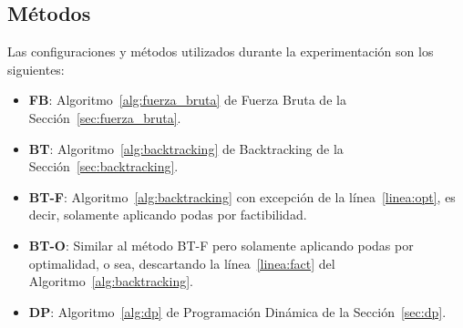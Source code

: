 \documentclass[10pt,a4paper]{article}
\begin{document}
\subsection{Métodos}
Las configuraciones y métodos utilizados durante la experimentación son los siguientes:
\begin{itemize}
    \setlength{\itemsep}{1pt}
    \setlength{\parskip}{0pt}
    \setlength{\parsep}{0pt}
    \item \textbf{FB}: Algoritmo~\ref{alg:fuerza_bruta} de Fuerza Bruta de la Sección~\ref{sec:fuerza_bruta}.
    \item \textbf{BT}: Algoritmo~\ref{alg:backtracking} de Backtracking de la Sección~\ref{sec:backtracking}.
    \item \textbf{BT-F}: Algoritmo~\ref{alg:backtracking} con excepción de la línea~\ref{linea:opt}, es decir, solamente aplicando podas por factibilidad.
    \item \textbf{BT-O}: Similar al método BT-F pero solamente aplicando podas por optimalidad, o sea, descartando la línea~\ref{linea:fact} del Algoritmo~\ref{alg:backtracking}.
    \item \textbf{DP}: Algoritmo~\ref{alg:dp} de Programación Dinámica de la Sección~\ref{sec:dp}.
\end{itemize}
\end{document}
